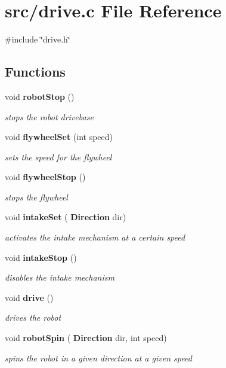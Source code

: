 \section{src/drive.c File Reference}
\label{drive_8c}
{\ttfamily \#include \char`\"{}drive.\+h\char`\"{}}\newline
\subsection*{Functions}
\begin{DoxyCompactItemize}
\item 
void \textbf{ robot\+Stop} ()
\begin{DoxyCompactList}\small\item\em stops the robot drivebase \end{DoxyCompactList}\item 
void \textbf{ flywheel\+Set} (int speed)
\begin{DoxyCompactList}\small\item\em sets the speed for the flywheel \end{DoxyCompactList}\item 
void \textbf{ flywheel\+Stop} ()
\begin{DoxyCompactList}\small\item\em stops the flywheel \end{DoxyCompactList}\item 
void \textbf{ intake\+Set} (\textbf{ Direction} dir)
\begin{DoxyCompactList}\small\item\em activates the intake mechanism at a certain speed \end{DoxyCompactList}\item 
void \textbf{ intake\+Stop} ()
\begin{DoxyCompactList}\small\item\em disables the intake mechanism \end{DoxyCompactList}\item 
void \textbf{ drive} ()
\begin{DoxyCompactList}\small\item\em drives the robot \end{DoxyCompactList}\item 
void \textbf{ robot\+Spin} (\textbf{ Direction} dir, int speed)
\begin{DoxyCompactList}\small\item\em spins the robot in a given direction at a given speed \end{DoxyCompactList}\item 

\end{DoxyCompactItemize}
